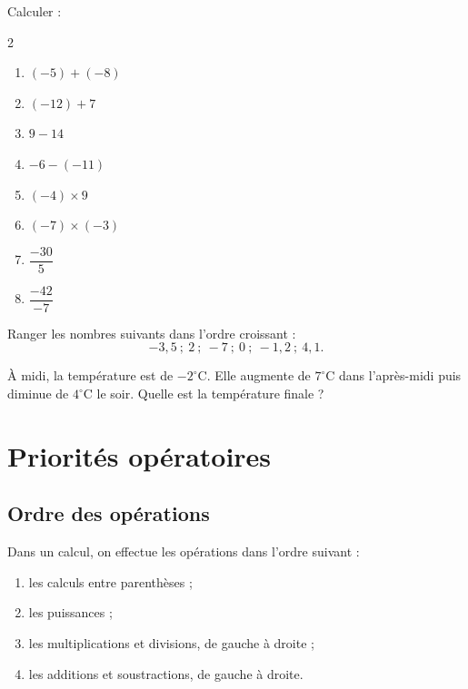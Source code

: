 \documentclass[11pt,a4paper]{article}
\newcounter{exercice}
\begin{document}
\begin{exercice}
Calculer :
\begin{multicols}{2}
\begin{enumerate}[label=\alph*)]
  \item $(-5)+(-8)$
  \item $(-12)+7$
  \item $9-14$
  \item $-6-(-11)$
  \item $(-4)\times 9$
  \item $(-7)\times(-3)$
  \item $\dfrac{-30}{5}$
  \item $\dfrac{-42}{-7}$
\end{enumerate}
\end{multicols}
\end{exercice}

\begin{exercice}[Méthode]
Ranger les nombres suivants dans l'ordre croissant :
\[
-3{,}5 \ ;\ 2 \ ;\ -7 \ ;\ 0 \ ;\ -1{,}2 \ ;\ 4{,}1.
\]
\end{exercice}

\begin{exercice}[Problème]
À midi, la température est de $-2^\circ$C. Elle augmente de $7^\circ$C dans l'après-midi puis diminue de $4^\circ$C le soir. Quelle est la température finale ?
\end{exercice}

\newpage

\section{Priorités opératoires}

\subsection{Ordre des opérations}

\begin{propriete}
Dans un calcul, on effectue les opérations dans l'ordre suivant :
\begin{enumerate}
  \item les calculs entre parenthèses ;
  \item les puissances ;
  \item les multiplications et divisions, de gauche à droite ;
  \item les additions et soustractions, de gauche à droite.
\end{enumerate}
\end{propriete}
\end{document}
